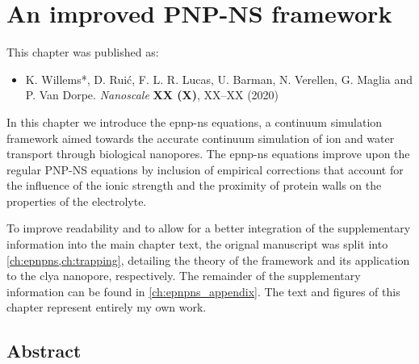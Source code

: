 %
\chapter{An improved PNP-NS framework}
%
\label{ch:epnpns}
%


%
%
\begin{shaded}
This chapter was published as:
%
\begin{itemize}
  \item K. Willems*, D. Rui\'{c}, F. L. R. Lucas, U. Barman, N. Verellen, G. Maglia and P. Van Dorpe.
        \textit{Nanoscale} \textbf{XX (X)}, XX--XX (2020) %
\end{itemize}
%
\newpage
\end{shaded}
%
%

\glsresetall
%

In this chapter we introduce the \gls{epnp-ns} equations, a continuum simulation framework aimed towards the
accurate continuum simulation of ion and water transport through biological nanopores. The \gls{epnp-ns}
equations improve upon the regular {PNP-NS} equations by inclusion of empirical corrections that account for
the influence of the ionic strength and the proximity of protein walls on the properties of the electrolyte.
%

%
To improve readability and to allow for a better integration of the supplementary information into the main
chapter text, the orignal manuscript was split into \cref{ch:epnpns,ch:trapping}, detailing the theory of the
framework and its application to the \gls{clya} nanopore, respectively. The remainder of the supplementary
information can be found in \cref{ch:epnpns_appendix}. The text and figures of this chapter represent entirely
my own work.
%

%
%
%


\section{Abstract}
%
\label{sec:epnpns:abstract}
%

